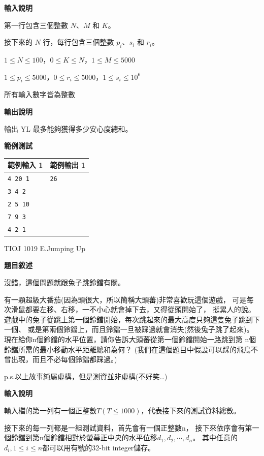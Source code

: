     \textbf{輸入說明}

    第一行包含三個整數 $N$、$M$ 和 $K$。

    接下來的 $N$ 行，每行包含三個整數 $p_i$、$s_i$ 和 $r_i$。

    $1 \le N \le 100$，$0 \le K \le N$，$1 \le M \le 5000$
    
    $1 \le p_i \le 5000$，$0 \le r_i \le 5000$，$1 \le s_i \le 10^6$

    所有輸入數字皆為整數

    \textbf{輸出說明}

    輸出 YL 最多能夠獲得多少安心度總和。

    \textbf{範例測試}

    \begin{tabular}{|m{7cm}|m{7cm}|}
        \hline
        範例輸入 1 & 範例輸出 1 \\
        \hline
        \verb|4 20 1| & \verb|26| \\
        \verb|3 4 2| & \\
        \verb|2 5 10| & \\
        \verb|7 9 3| & \\
        \verb|4 2 1| & \\
        \hline
    \end{tabular}

    \problem TIOJ 1019 E.Jumping Up

    \textbf{題目敘述}

    
    沒錯，這個問題就跟兔子跳鈴鐺有關。

    有一顆超級大番茄(因為頭很大，所以簡稱大頭蕃)非常喜歡玩這個遊戲，
    可是每次滑鼠都要左移、右移，一不小心就會掉下去，又得從頭開始了，
    挺累人的說。遊戲中的兔子從跳上第一個鈴鐺開始，每次跳起來的最大高度只夠這隻兔子跳到下一個、
    或是第兩個鈴鐺上，而且鈴鐺一旦被踩過就會消失(然後兔子跳了起來)。
    現在給你n個鈴鐺的水平位置，請你告訴大頭蕃從第一個鈴鐺開始一路跳到第 n個鈴鐺所需的最小移動水平距離總和為何？
    (我們在這個題目中假設可以踩的飛鳥不曾出現，而且不必每個鈴鐺都踩過。)

    p.s.以上故事純屬虛構，但是測資並非虛構(不好笑…)

    \textbf{輸入說明}

    輸入檔的第一列有一個正整數$T(T \le 1000)$，代表接下來的測試資料總數。
    
    接下來的每一列都是一組測試資料，首先會有一個正整數n，
    接下來依序會有第一個鈴鐺到第n個鈴鐺相對於螢幕正中央的水平位移$d_1,d_2, \cdots , d_n$。
    其中任意的$d_i, 1 \le i \le n$都可以用有號的32-bit integer儲存。

